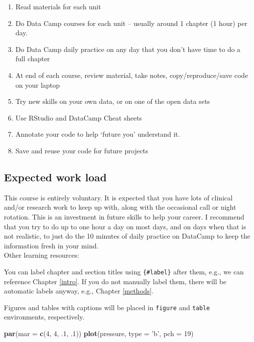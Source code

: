 \documentclass[
]{book}
\newenvironment{Shaded}{\begin{snugshade}}{\end{snugshade}}
\newcommand{\DataTypeTok}[1]{\textcolor[rgb]{0.13,0.29,0.53}{#1}}
\newcommand{\DecValTok}[1]{\textcolor[rgb]{0.00,0.00,0.81}{#1}}
\newcommand{\FloatTok}[1]{\textcolor[rgb]{0.00,0.00,0.81}{#1}}
\newcommand{\KeywordTok}[1]{\textcolor[rgb]{0.13,0.29,0.53}{\textbf{#1}}}
\newcommand{\NormalTok}[1]{#1}
\newcommand{\StringTok}[1]{\textcolor[rgb]{0.31,0.60,0.02}{#1}}
\providecommand{\tightlist}{%
  \setlength{\itemsep}{0pt}\setlength{\parskip}{0pt}}
\begin{document}
\begin{enumerate}
\def\labelenumi{\arabic{enumi}.}
\tightlist
\item
  Read materials for each unit
\item
  Do Data Camp courses for each unit -- usually around 1 chapter (1 hour) per day.
\item
  Do Data Camp daily practice on any day that you don't have time to do a full chapter
\item
  At end of each course, review material, take notes, copy/reproduce/save code on your laptop
\item
  Try new skills on your own data, or on one of the open data sets
\item
  Use RStudio and DataCamp Cheat sheets
\item
  Annotate your code to help `future you' understand it.
\item
  Save and reuse your code for future projects
\end{enumerate}

\hypertarget{expected-work-load}{%
\subsection{Expected work load}\label{expected-work-load}}

This course is entirely voluntary. It is expected that you have lots of clinical and/or research work to keep up with, along with the occasional call or night rotation. This is an investment in future skills to help your career. I recommend that you try to do up to one hour a day on most days, and on days when that is not realistic, to just do the 10 minutes of daily practice on DataCamp to keep the information fresh in your mind.\\
Other learning resources:

You can label chapter and section titles using \texttt{\{\#label\}} after them, e.g., we can reference Chapter \ref{intro}. If you do not manually label them, there will be automatic labels anyway, e.g., Chapter \ref{methods}.

Figures and tables with captions will be placed in \texttt{figure} and \texttt{table} environments, respectively.

\begin{Shaded}
\begin{Highlighting}[]
\KeywordTok{par}\NormalTok{(}\DataTypeTok{mar =} \KeywordTok{c}\NormalTok{(}\DecValTok{4}\NormalTok{, }\DecValTok{4}\NormalTok{, }\FloatTok{.1}\NormalTok{, }\FloatTok{.1}\NormalTok{))}
\KeywordTok{plot}\NormalTok{(pressure, }\DataTypeTok{type =} \StringTok{'b'}\NormalTok{, }\DataTypeTok{pch =} \DecValTok{19}\NormalTok{)}
\end{Highlighting}
\end{Shaded}
\end{document}
